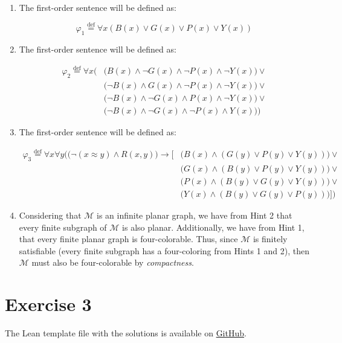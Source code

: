 \documentclass[11pt]{article}
\newcommand*{\defeq}{\stackrel{\text{def}}{=}}
\begin{document}
\begin{enumerate}
    \item The first-order sentence will be defined as:
    
    $$\varphi_1 \defeq \forall x (B(x) \lor G(x) \lor P(x) \lor Y(x))$$
    
    \item The first-order sentence will be defined as:
    
    \begin{align*}
        \varphi_2 \defeq \forall x \Big( & \big(B(x) \land \lnot G(x) \land \lnot P(x) \land \lnot Y(x)\big) \lor \\
          & \big(\lnot B(x) \land G(x) \land \lnot P(x) \land \lnot Y(x)\big) \lor\\
          &\big(\lnot B(x) \land \lnot G(x) \land P(x) \land \lnot Y(x)\big) \lor \\
          &\big(\lnot B(x) \land \lnot G(x) \land \lnot P(x) \land Y(x)\big)\Big)
    \end{align*}

    \item The first-order sentence will be defined as:
    
    \begin{align*}
        \varphi_3 \defeq \forall x \forall y \Big( \big(\lnot (x \approx y) \land R(x, y)\big) \to \big[ & \big(B(x) \land (G(y) \lor P(y) \lor Y(y))\big) \lor \\
        & \big(G(x) \land (B(y) \lor P(y) \lor Y(y))\big) \lor \\
        & \big(P(x) \land (B(y) \lor G(y) \lor Y(y))\big) \lor \\
        & \big(Y(x) \land (B(y) \lor G(y) \lor P(y))\big)\big]\Big)
    \end{align*}
    
    \item Considering that $\mathcal{M}$ is an infinite planar graph, we have from Hint 2 that every finite subgraph of $\mathcal{M}$ is also planar. Additionally, we have from Hint 1, that every finite planar graph is four-colorable. Thus, since $\mathcal{M}$ is finitely satisfiable (every finite subgraph has a four-coloring from Hints 1 and 2), then $\mathcal{M}$ must also be four-colorable by \textit{compactness}. 
\end{enumerate}


\section*{Exercise 3}
The Lean template file with the solutions is available on \href{https://github.com/lucastassis/BU-CS511/blob/main/HW10/code/HW10.lean}{GitHub}.
\end{document}
